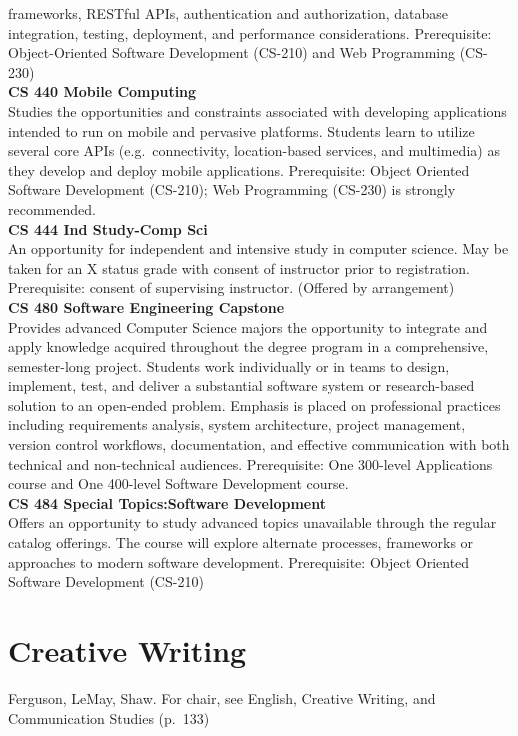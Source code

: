 \documentclass[
  letterpaper,
]{scrbook}
\begin{document}
frameworks, RESTful APIs, authentication and authorization, database
integration, testing, deployment, and performance considerations.
Prerequisite: Object-Oriented Software Development (CS-210) and Web
Programming (CS-230)\\
\textbf{CS 440 Mobile Computing}\\
Studies the opportunities and constraints associated with developing
applications intended to run on mobile and pervasive platforms. Students
learn to utilize several core APIs (e.g.~connectivity, location-based
services, and multimedia) as they develop and deploy mobile
applications. Prerequisite: Object Oriented Software Development
(CS-210); Web Programming (CS-230) is strongly recommended.\\
\textbf{CS 444 Ind Study-Comp Sci}\\
An opportunity for independent and intensive study in computer science.
May be taken for an X status grade with consent of instructor prior to
registration. Prerequisite: consent of supervising instructor. (Offered
by arrangement)\\
\textbf{CS 480 Software Engineering Capstone}\\
Provides advanced Computer Science majors the opportunity to integrate
and apply knowledge acquired throughout the degree program in a
comprehensive, semester-long project. Students work individually or in
teams to design, implement, test, and deliver a substantial software
system or research-based solution to an open-ended problem. Emphasis is
placed on professional practices including requirements analysis, system
architecture, project management, version control workflows,
documentation, and effective communication with both technical and
non-technical audiences. Prerequisite: One 300-level Applications course
and One 400-level Software Development course.\\
\textbf{CS 484 Special Topics:Software Development}\\
Offers an opportunity to study advanced topics unavailable through the
regular catalog offerings. The course will explore alternate processes,
frameworks or approaches to modern software development. Prerequisite:
Object Oriented Software Development (CS-210)

\section{Creative Writing}\label{creative-writing}

Ferguson, LeMay, Shaw. For chair, see English, Creative Writing, and
Communication Studies (p.~133)
\end{document}
